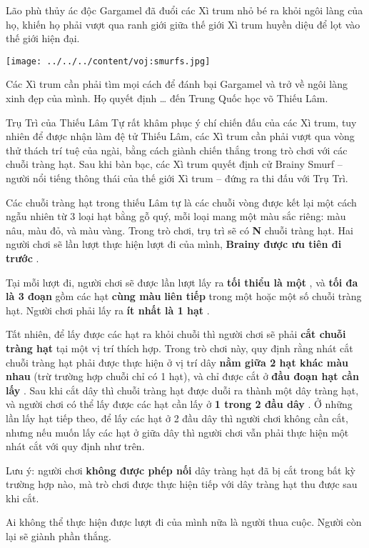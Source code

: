 

Lão phù thủy ác độc Gargamel đã đuổi các Xì trum nhỏ bé ra khỏi ngôi làng của họ, khiến họ phải vượt qua ranh giới giữa thế giới Xì trum huyền diệu để lọt vào thế giới hiện đại.


\texttt{[image: ../../../content/voj:smurfs.jpg]}

Các Xì trum cần phải tìm mọi cách để đánh bại Gargamel và trở về ngôi làng xinh đẹp của mình. Họ quyết định … đến Trung Quốc học võ Thiếu Lâm.

Trụ Trì của Thiếu Lâm Tự rất khâm phục ý chí chiến đấu của các Xì trum, tuy nhiên để được nhận làm đệ tử Thiếu Lâm, các Xì trum cần phải vượt qua vòng thử thách trí tuệ của ngài, bằng cách giành chiến thắng trong trò chơi với các chuỗi tràng hạt. Sau khi bàn bạc, các Xì trum quyết định cử Brainy Smurf – người nổi tiếng thông thái của thế giới Xì trum – đứng ra thi đấu với Trụ Trì.

Các chuỗi tràng hạt trong thiếu Lâm tự là các chuỗi vòng được kết lại một cách ngẫu nhiên từ 3 loại hạt bằng gỗ quý, mỗi loại mang một màu sắc riêng: màu nâu, màu đỏ, và màu vàng. Trong trò chơi, trụ trì sẽ có \textbf{ N } chuỗi tràng hạt. Hai người chơi sẽ lần lượt thực hiện lượt đi của mình, \textbf{ Brainy được ưu tiên đi trước } .

Tại mỗi lượt đi, người chơi sẽ được lần lượt lấy ra \textbf{ tối thiểu là một } , và \textbf{ tối đa là 3 đoạn } gồm các hạt \textbf{ cùng màu }\textbf{ liên tiếp } trong một hoặc một số chuỗi tràng hạt. Người chơi phải lấy ra \textbf{ ít nhất là 1 hạt } .

Tất nhiên, để lấy được các hạt ra khỏi chuỗi thì người chơi sẽ phải \textbf{ cắt chuỗi tràng hạt } tại một vị trí thích hợp. Trong trò chơi này, quy định rằng nhát cắt chuỗi tràng hạt phải được thực hiện ở vị trí dây \textbf{ nằm giữa 2 hạt khác màu nhau } (trừ trường hợp chuỗi chỉ có 1 hạt), và chỉ được cắt ở \textbf{ đầu đoạn hạt cần lấy } . Sau khi cắt dây thì chuỗi tràng hạt được duỗi ra thành một dây tràng hạt, và người chơi có thể lấy được các hạt cần lấy ở \textbf{ 1 trong 2 đầu dây } . Ở những lần lấy hạt tiếp theo, để lấy các hạt ở 2 đầu dây thì người chơi không cần cắt, nhưng nếu muốn lấy các hạt ở giữa dây thì người chơi vẫn phải thực hiện một nhát cắt với quy định như trên.

Lưu ý: người chơi \textbf{ không được phép nối } dây tràng hạt đã bị cắt trong bất kỳ trường hợp nào, mà trò chơi được thực hiện tiếp với dây tràng hạt thu được sau khi cắt.

Ai không thể thực hiện được lượt đi của mình nữa là người thua cuộc. Người còn lại sẽ giành phần thắng.

